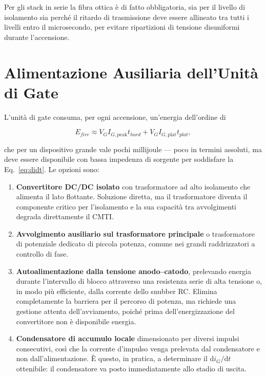 \documentclass[11pt,a4paper]{article}
\begin{document}
Per gli stack in serie la fibra ottica è di fatto obbligatoria, sia per il livello di
isolamento sia perché il ritardo di trasmissione deve essere allineato tra tutti i
livelli entro il microsecondo, per evitare ripartizioni di tensione disuniformi
durante l'accensione.

\section{Alimentazione Ausiliaria dell'Unità di Gate}

L'unità di gate consuma, per ogni accensione, un'energia dell'ordine di

\begin{equation}
  E_{fire} \approx V_G I_{G,\text{peak}} t_{hard} + V_G I_{G,\text{plat}} t_{plat},
\end{equation}

che per un dispositivo grande vale pochi millijoule --- poco in termini assoluti, ma
deve essere disponibile con bassa impedenza di sorgente per soddisfare la
Eq.~\eqref{eq:didt}. Le opzioni sono:

\begin{enumerate}
  \item \textbf{Convertitore DC/DC isolato} con trasformatore ad alto isolamento che
        alimenta il lato flottante. Soluzione diretta, ma il trasformatore diventa il
        componente critico per l'isolamento e la sua capacità tra avvolgimenti
        degrada direttamente il CMTI.
  \item \textbf{Avvolgimento ausiliario sul trasformatore principale} o
        trasformatore di potenziale dedicato di piccola potenza, comune nei grandi
        raddrizzatori a controllo di fase.
  \item \textbf{Autoalimentazione dalla tensione anodo--catodo}, prelevando energia
        durante l'intervallo di blocco attraverso una resistenza serie di alta
        tensione o, in modo più efficiente, dalla corrente dello snubber RC. Elimina
        completamente la barriera per il percorso di potenza, ma richiede una
        gestione attenta dell'avviamento, poiché prima dell'energizzazione del
        convertitore non è disponibile energia.
  \item \textbf{Condensatore di accumulo locale} dimensionato per diversi impulsi
        consecutivi, così che la corrente d'impulso venga prelevata dal condensatore
        e non dall'alimentazione. È questo, in pratica, a determinare il
        $\mathrm{d}i_G/\mathrm{d}t$ ottenibile: il condensatore va posto
        immediatamente allo stadio di uscita.
\end{enumerate}
\end{document}

